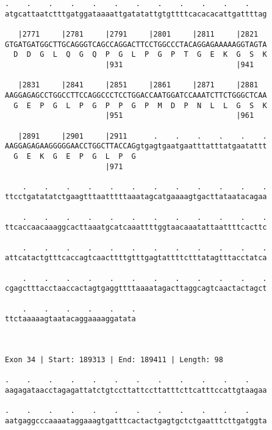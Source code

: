 \documentclass{article}
\begin{document}
\begin{Verbatim}
.    .    .    .    .    .    .    .    .    .    .    .    
atgcattaatctttgatggataaaattgatatattgtgttttcacacacattgattttag
                                                            
   |2771     |2781     |2791     |2801     |2811     |2821  
GTGATGATGGCTTGCAGGGTCAGCCAGGACTTCCTGGCCCTACAGGAGAAAAAGGTAGTA
  D  D  G  L  Q  G  Q  P  G  L  P  G  P  T  G  E  K  G  S  K
                       |931                          |941   
  
   |2831     |2841     |2851     |2861     |2871     |2881  
AAGGAGAGCCTGGCCTTCCAGGCCCTCCTGGACCAATGGATCCAAATCTTCTGGGCTCAA
  G  E  P  G  L  P  G  P  P  G  P  M  D  P  N  L  L  G  S  K
                       |951                          |961   
  
   |2891     |2901     |2911      .    .    .    .    .    .
AAGGAGAGAAGGGGGAACCTGGCTTACCAGgtgagtgaatgaatttatttatgaatattt
  G  E  K  G  E  P  G  L  P  G                              
                       |971                                 
  
    .    .    .    .    .    .    .    .    .    .    .    .
ttcctgatatatctgaagtttaatttttaaatagcatgaaaagtgacttataatacagaa
                                                            
    .    .    .    .    .    .    .    .    .    .    .    .
ttcaccaacaaaggcacttaaatgcatcaaattttggtaacaaatattaattttcacttc
                                                            
    .    .    .    .    .    .    .    .    .    .    .    .
attcatactgtttcaccagtcaacttttgtttgagtattttctttatagtttacctatca
                                                            
    .    .    .    .    .    .    .    .    .    .    .    .
cgagctttacctaaccactagtgaggttttaaaatagacttaggcagtcaactactagct
                                                            
    .    .    .    .    .    .
ttctaaaaagtaatacaggaaaaggatata
                              
                              
 
Exon 34 | Start: 189313 | End: 189411 | Length: 98
 
.    .    .    .    .    .    .    .    .    .    .    .    
aagagataacctagagattatctgtccttattccttatttcttcatttccattgtaagaa
                                                            
.    .    .    .    .    .    .    .    .    .    .    .    
aatgaggcccaaaataggaaagtgatttcactactgagtgctctgaatttcttgatggta
                                                            

\end{Verbatim}
\end{document}
